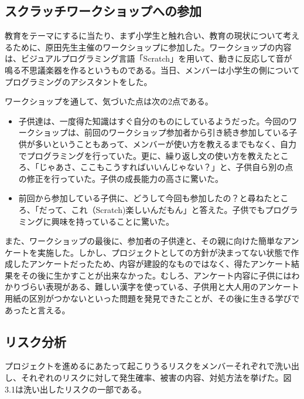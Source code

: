 \documentclass[openany,11pt,papersize]{jsbook}
\begin{document}
\subsection{スクラッチワークショップへの参加}
\par 教育をテーマにするに当たり、まず小学生と触れ合い、教育の現状について考えるために、原田先生主催のワークショップに参加した。ワークショップの内容は、ビジュアルプログラミング言語「Scratch」を用いて、動きに反応して音が鳴る不思議楽器を作るというものである。当日、メンバーは小学生の側についてプログラミングのアシスタントをした。
\par ワークショップを通して、気づいた点は次の2点である。
\begin{itemize}
\item 子供達は、一度得た知識はすぐ自分のものにしているようだった。今回のワークショップは、前回のワークショップ参加者から引き続き参加している子供が多いということもあって、メンバーが使い方を教えるまでもなく、自力でプログラミングを行っていた。更に、繰り返し文の使い方を教えたところ、「じゃあさ、ここもこうすればいいんじゃない？」と、子供自ら別の点の修正を行っていた。子供の成長能力の高さに驚いた。
\item 前回から参加している子供に、どうして今回も参加したの？と尋ねたところ、「だって、これ（Scratch)楽しいんだもん」と答えた。子供でもプログラミングに興味を持っていることに驚いた。
\end{itemize}

\par また、ワークショップの最後に、参加者の子供達と、その親に向けた簡単なアンケートを実施した。しかし、プロジェクトとしての方針が決まってない状態で作成したアンケートだったため、内容が建設的なものではなく、得たアンケート結果をその後に生かすことが出来なかった。むしろ、アンケート内容に子供にはわかりづらい表現がある、難しい漢字を使っている、子供用と大人用のアンケート用紙の区別がつかないといった問題を発見できたことが、その後に生きる学びであったと言える。


\subsection{リスク分析}
\par プロジェクトを進めるにあたって起こりうるリスクをメンバーそれぞれで洗い出し、それぞれのリスクに対して発生確率、被害の内容、対処方法を挙げた。図3.1は洗い出したリスクの一部である。
\end{document}
